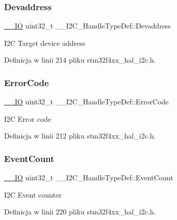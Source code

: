 \subsubsection{\texorpdfstring{Devaddress}{Devaddress}}
{\footnotesize\ttfamily \hyperlink{core__sc300_8h_aec43007d9998a0a0e01faede4133d6be}{\+\_\+\+\_\+\+IO} uint32\+\_\+t \+\_\+\+\_\+\+I2\+C\+\_\+\+Handle\+Type\+Def\+::\+Devaddress}

I2C Target device address 

Definicja w linii 214 pliku stm32f4xx\+\_\+hal\+\_\+i2c.\+h.

\mbox{\label{struct_____i2_c___handle_type_def_a824099e364465827123cda831284f643}} 
\subsubsection{\texorpdfstring{Error\+Code}{ErrorCode}}
{\footnotesize\ttfamily \hyperlink{core__sc300_8h_aec43007d9998a0a0e01faede4133d6be}{\+\_\+\+\_\+\+IO} uint32\+\_\+t \+\_\+\+\_\+\+I2\+C\+\_\+\+Handle\+Type\+Def\+::\+Error\+Code}

I2C Error code 

Definicja w linii 212 pliku stm32f4xx\+\_\+hal\+\_\+i2c.\+h.

\mbox{\label{struct_____i2_c___handle_type_def_a585f68fb576ac0b98ecb37ae86d964f2}} 
\subsubsection{\texorpdfstring{Event\+Count}{EventCount}}
{\footnotesize\ttfamily \hyperlink{core__sc300_8h_aec43007d9998a0a0e01faede4133d6be}{\+\_\+\+\_\+\+IO} uint32\+\_\+t \+\_\+\+\_\+\+I2\+C\+\_\+\+Handle\+Type\+Def\+::\+Event\+Count}

I2C Event counter 

Definicja w linii 220 pliku stm32f4xx\+\_\+hal\+\_\+i2c.\+h.

